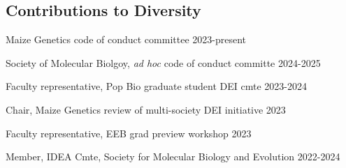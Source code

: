 \documentclass[letterpaper,10pt]{article}
\renewenvironment{itemize}{
  \begin{list}{}{
    \setlength{\leftmargin}{1.5em}
  }
}{
  \end{list}
}
\begin{document}


\subsection*{Contributions to Diversity}
\begin{itemize}
  \setlength\itemsep{0ex}
  \item Maize Genetics code of conduct committee \hfill 2023-present %
  \item Society of Molecular Biolgoy, \textit{ad hoc} code of conduct committe \hfill 2024-2025 %
  \item Faculty representative, Pop Bio graduate student DEI cmte \hfill 2023-2024
  \item Chair, Maize Genetics review of multi-society DEI initiative \hfill 2023
  \item Faculty representative, EEB grad preview workshop \hfill 2023
  \item Member, IDEA Cmte, Society for Molecular Biology and Evolution \hfill2022-2024
\end{itemize}
\end{document}
